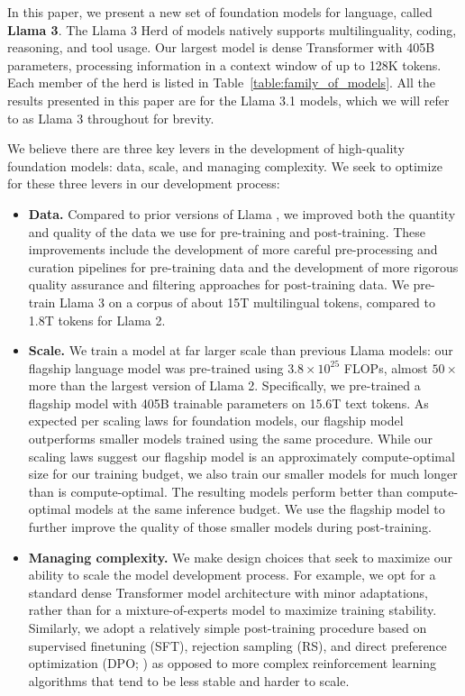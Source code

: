 In this paper, we present a new set of foundation models for language, called \textbf{Llama 3}. 
The Llama 3 Herd of models natively supports multilinguality, coding, reasoning, and tool usage.
Our largest model is dense Transformer with 405B parameters, processing information in a context window of up to 128K tokens.
Each member of the herd is listed in Table~\ref{table:family_of_models}.
All the results presented in this paper are for the Llama 3.1 models, which we will refer to as Llama 3 throughout for brevity.

We believe there are three key levers in the development of high-quality foundation models: data, scale, and managing complexity. 
We seek to optimize for these three levers in our development process:

\begin{itemize}
\item \textbf{Data.} Compared to prior versions of Llama \citep{touvron2023llama,touvron2023llama2}, we improved both the quantity and quality of the data we use for pre-training and post-training.
These improvements include the development of more careful pre-processing and curation pipelines for pre-training data and the development of more rigorous quality assurance and filtering approaches for post-training data.
We pre-train Llama 3 on a corpus of about 15T multilingual tokens, compared to 1.8T tokens for Llama 2. 

\item \textbf{Scale.} We train a model at far larger scale than previous Llama models: our flagship language model was pre-trained using $3.8 \times 10^{25}$ FLOPs, almost $50\times$ more than the largest version of Llama 2. 
Specifically, we pre-trained a flagship model with 405B trainable parameters on 15.6T text tokens.
As expected per scaling laws for foundation models, our flagship model outperforms smaller models trained using the same procedure. 
While our scaling laws suggest our flagship model is an approximately compute-optimal size for our training budget, we also train our smaller models for much longer than is compute-optimal.
The resulting models perform better than compute-optimal models at the same inference budget.
We use the flagship model to further improve the quality of those smaller models during post-training. 

\item \textbf{Managing complexity.} We make design choices that seek to maximize our ability to scale the model development process. 
For example, we opt for a standard dense Transformer model architecture \citep{vaswani2017attention} with minor adaptations, rather than for a mixture-of-experts model \citep{shazeer2017moe} to maximize training stability. 
Similarly, we adopt a relatively simple post-training procedure based on supervised finetuning (SFT), rejection sampling (RS), and direct preference optimization (DPO; \citet{rafailov2023dpo}) as opposed to more complex reinforcement learning algorithms \citep{ouyang2022instructgpt,schulman2017proximal} that tend to be less stable and harder to scale. 
\end{itemize}

